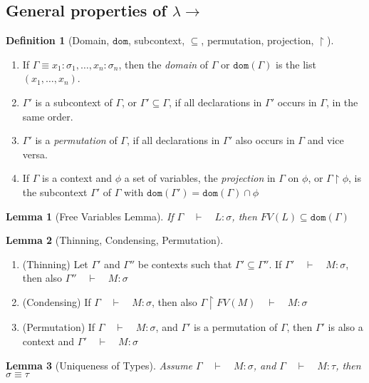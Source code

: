 \documentclass[12pt, a4paper]{article}
\newcommand{\deriv}{\quad\vdash\quad}
\newtheorem{definition}{Definition}[section]
\newtheorem{lemma}{Lemma}[section]
\begin{document}
\subsection{General properties of \texorpdfstring{$\lambda\to$}{Lg}}
\begin{definition}[Domain, $\mathtt{dom}$, subcontext, $\subseteq$, permutation, projection, $\restriction$]
\end{definition}
\begin{enumerate}
    \item If $\Gamma \equiv x_1 : \sigma_1, \dots, x_n : \sigma_n$, then the \textit{domain} of $\Gamma$ or $\mathtt{dom}(\Gamma)$ is the list $(x_1,\dots,x_n)$.
    \item $\Gamma'$ is a subcontext of $\Gamma$, or $\Gamma' \subseteq \Gamma$, if all declarations in $\Gamma'$ occurs in $\Gamma$, in the same order.
    \item $\Gamma'$ is a \textit{permutation} of $\Gamma$, if all declarations in $\Gamma'$ also occurs in $\Gamma$ and vice versa.
    \item If $\Gamma$ is a context and $\phi$ a set of variables, the \textit{projection} in $\Gamma$ on $\phi$, or $\Gamma \restriction \phi$, is the subcontext $\Gamma'$ of $\Gamma$ with $\mathtt{dom}(\Gamma') = \mathtt{dom}(\Gamma) \cap \phi$
\end{enumerate}

\begin{lemma}[Free Variables Lemma]
    If $\Gamma \deriv L : \sigma$, then $FV(L) \subseteq \mathtt{dom}(\Gamma)$
\end{lemma}

\begin{lemma}[Thinning, Condensing, Permutation]
\end{lemma}
\begin{enumerate}
    \item (Thinning) Let $\Gamma'$ and $\Gamma''$ be contexts such that $\Gamma' \subseteq \Gamma''$. If $\Gamma' \deriv M : \sigma$, then also $\Gamma'' \deriv M : \sigma$
    \item (Condensing) If $\Gamma \deriv M : \sigma$, then also $\Gamma \restriction FV(M) \deriv M : \sigma$
    \item (Permutation) If $\Gamma \deriv M : \sigma$, and $\Gamma'$ is a permutation of $\Gamma$, then $\Gamma'$ is also a context and $\Gamma' \deriv M : \sigma$
\end{enumerate}

\begin{lemma}[Uniqueness of Types]
    Assume $\Gamma \deriv M : \sigma$, and $\Gamma \deriv M : \tau$, then $\sigma \equiv \tau$
\end{lemma}
\end{document}
